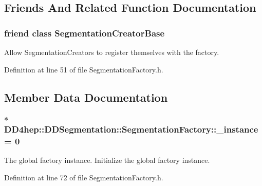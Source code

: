 \subsection{Friends And Related Function Documentation}
\hypertarget{class_d_d4hep_1_1_d_d_segmentation_1_1_segmentation_factory_ab25c2677f6e2445716078cc5c9e87009}{
\subsubsection[{SegmentationCreatorBase}]{\setlength{\rightskip}{0pt plus 5cm}friend class {\bf SegmentationCreatorBase}}}
\label{class_d_d4hep_1_1_d_d_segmentation_1_1_segmentation_factory_ab25c2677f6e2445716078cc5c9e87009}


Allow SegmentationCreators to register themselves with the factory. 

Definition at line 51 of file SegmentationFactory.h.

\subsection{Member Data Documentation}
\hypertarget{class_d_d4hep_1_1_d_d_segmentation_1_1_segmentation_factory_a1feb10e4594795939255eb57b80a76dd}{
\subsubsection[{\_\-instance}]{ $\ast$ {\bf DD4hep::DDSegmentation::SegmentationFactory::\_\-instance} = 0}}
\label{class_d_d4hep_1_1_d_d_segmentation_1_1_segmentation_factory_a1feb10e4594795939255eb57b80a76dd}


The global factory instance. Initialize the global factory instance. 

Definition at line 72 of file SegmentationFactory.h.

